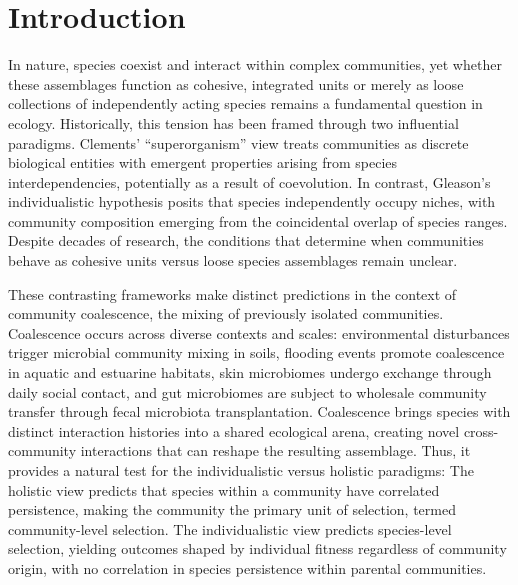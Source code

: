 \section{Introduction}
\label{sec:introduction}

In nature, species coexist and interact within complex communities, yet whether these assemblages function as cohesive, integrated units or merely as loose collections of independently acting species remains a fundamental question in ecology. Historically, this tension has been framed through two influential paradigms. Clements’ “superorganism” view treats communities as discrete biological entities with emergent properties arising from species interdependencies, potentially as a result of coevolution\citep{Clements1916, Clements1936, Odum1969, Lovelock1979, WilsonSober1989}. In contrast, Gleason’s individualistic hypothesis posits that species independently occupy niches, with community composition emerging from the coincidental overlap of species ranges\citep{Gleason1939, Cain1947, Mason1947, Whittaker1967}. Despite decades of research, the conditions that determine when communities behave as cohesive units versus loose species assemblages remain unclear.

These contrasting frameworks make distinct predictions in the context of community coalescence, the mixing of previously isolated communities\citep{Rillig2015, Lechon2021}. Coalescence occurs across diverse contexts and scales: environmental disturbances trigger microbial community mixing in soils\citep{Huet2023, Bresciani2025}, flooding events promote coalescence in aquatic and estuarine habitats\citep{Liu2024}, skin microbiomes undergo exchange through daily social contact\citep{Sarkar2024}, and gut microbiomes are subject to wholesale community transfer through fecal microbiota transplantation\citep{Xiao2020, Gupta2016}. Coalescence brings species with distinct interaction histories into a shared ecological arena, creating novel cross-community interactions that can reshape the resulting assemblage\citep{Rillig2015}. Thus, it provides a natural test for the individualistic versus holistic paradigms: The holistic view predicts that species within a community have correlated persistence, making the community the primary unit of selection, termed community-level selection. The individualistic view predicts species-level selection, yielding outcomes shaped by individual fitness regardless of community origin, with no correlation in species persistence within parental communities.

